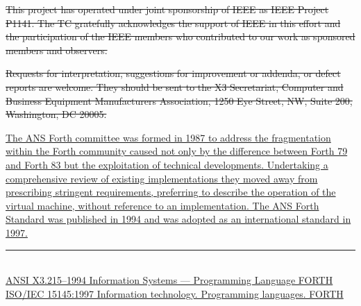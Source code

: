 \sout{%
This project has operated under joint sponsorship of IEEE as IEEE Project P1141.
The TC gratefully acknowledges the support of IEEE in this effort and the
participation of the IEEE members who contributed to our work as sponsored
members and observers.}

\sout{%
Requests for interpretation, suggestions for improvement or addenda, or defect
reports are welcome. They should be sent to the X3 Secretariat, Computer and
Business Equipment Manufacturers Association, 1250 Eye Street, NW, Suite 200,
Washington, DC 20005.}

\uline{%
The ANS Forth committee was formed in 1987 to address the fragmentation
within the Forth community caused not only by the difference between Forth 79
and Forth 83 but the exploitation of technical de\-vel\-op\-ments.  Undertaking a
comprehensive review of existing implementations they moved away from
prescribing stringent requirements, preferring to describe the operation of the
virtual machine, without reference to an implementation.  The ANS Forth
Standard was published in 1994\raisebox{1ex}{\scriptsize 1} and was adopted as an
international standard in 1997\raisebox{1ex}{\scriptsize 2}.}
\cbend

\enlargethispage{4ex}
\vfill
\cbstart
\rule{100pt}{1pt} \\[-0.5ex]
{\footnotesize
\raisebox{1ex}{\scriptsize 1} \uline{ANSI X3.215--1994 Information Systems --- Programming Language FORTH} \\
\raisebox{1ex}{\scriptsize 2} \uline{ISO/IEC 15145:1997 Information technology.  Programming languages.  FORTH} \\
}
\cbend

